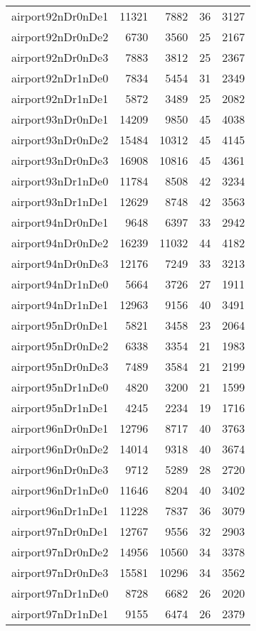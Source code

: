 \begin{longtable}{lrrrr}
airport92nDr0nDe1 & 11321 & 7882 & 36 & 3127 \\
airport92nDr0nDe2 & 6730 & 3560 & 25 & 2167 \\
airport92nDr0nDe3 & 7883 & 3812 & 25 & 2367 \\
airport92nDr1nDe0 & 7834 & 5454 & 31 & 2349 \\
airport92nDr1nDe1 & 5872 & 3489 & 25 & 2082 \\
airport93nDr0nDe1 & 14209 & 9850 & 45 & 4038 \\
airport93nDr0nDe2 & 15484 & 10312 & 45 & 4145 \\
airport93nDr0nDe3 & 16908 & 10816 & 45 & 4361 \\
airport93nDr1nDe0 & 11784 & 8508 & 42 & 3234 \\
airport93nDr1nDe1 & 12629 & 8748 & 42 & 3563 \\
airport94nDr0nDe1 & 9648 & 6397 & 33 & 2942 \\
airport94nDr0nDe2 & 16239 & 11032 & 44 & 4182 \\
airport94nDr0nDe3 & 12176 & 7249 & 33 & 3213 \\
airport94nDr1nDe0 & 5664 & 3726 & 27 & 1911 \\
airport94nDr1nDe1 & 12963 & 9156 & 40 & 3491 \\
airport95nDr0nDe1 & 5821 & 3458 & 23 & 2064 \\
airport95nDr0nDe2 & 6338 & 3354 & 21 & 1983 \\
airport95nDr0nDe3 & 7489 & 3584 & 21 & 2199 \\
airport95nDr1nDe0 & 4820 & 3200 & 21 & 1599 \\
airport95nDr1nDe1 & 4245 & 2234 & 19 & 1716 \\
airport96nDr0nDe1 & 12796 & 8717 & 40 & 3763 \\
airport96nDr0nDe2 & 14014 & 9318 & 40 & 3674 \\
airport96nDr0nDe3 & 9712 & 5289 & 28 & 2720 \\
airport96nDr1nDe0 & 11646 & 8204 & 40 & 3402 \\
airport96nDr1nDe1 & 11228 & 7837 & 36 & 3079 \\
airport97nDr0nDe1 & 12767 & 9556 & 32 & 2903 \\
airport97nDr0nDe2 & 14956 & 10560 & 34 & 3378 \\
airport97nDr0nDe3 & 15581 & 10296 & 34 & 3562 \\
airport97nDr1nDe0 & 8728 & 6682 & 26 & 2020 \\
airport97nDr1nDe1 & 9155 & 6474 & 26 & 2379 \\

\end{longtable}
